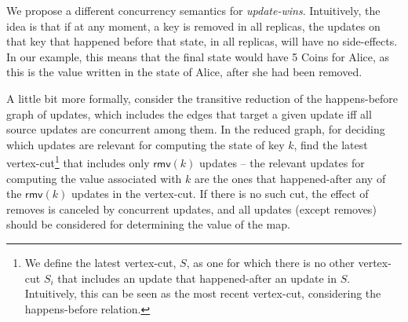 \documentclass[12pt]{article}
\begin{document}


We propose a different concurrency semantics for \emph{update-wins}.
Intuitively, the idea is that if at any moment, a key is removed in all replicas,
the updates on that key that happened before that state, in all replicas, will 
have no side-effects.
In our example, this means that the final state would have 5 Coins for Alice,
as this is the value written in the state of Alice, after she had been removed.

A little bit more formally, consider the transitive reduction of the 
happens-before graph of updates, which includes the edges that target 
a given update iff all source updates are concurrent among them.
In the reduced graph, for deciding which updates are relevant for computing the
state of key $k$, find the latest vertex-cut\footnote{We define the latest vertex-cut, $S$,
as one for which there is no other vertex-cut $S_i$ that includes an update that 
happened-after an update in $S$. Intuitively, this can be seen as the most recent vertex-cut,
considering the happens-before relation.} 
that includes only $\mathsf{rmv}(k)$ updates -- the relevant updates for computing the
value associated with $k$ are the ones that happened-after any of the 
$\mathsf{rmv}(k)$ updates in the vertex-cut. 
If there is no such cut, the effect of removes is canceled by concurrent updates, and
all updates (except removes) should be considered for determining the value of the map.
\end{document}
